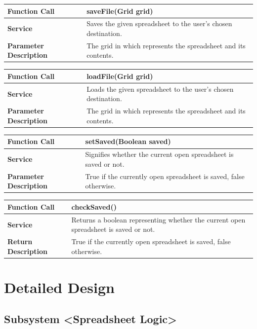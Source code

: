 \documentclass[12pt]{article}
\begin{document}
\begin{tabular}{|p{4.75cm}|p{11.25cm}|}
\hline
\textbf{Function Call} & saveFile(Grid grid)
\\\hline
\textbf{Service} & Saves the given spreadsheet to the user's chosen destination. 
\\\hline
\textbf{Parameter Description} & The grid in which represents the spreadsheet and its contents.
\\\hline
\end{tabular}

\begin{tabular}{|p{4.75cm}|p{11.25cm}|}
\hline
\textbf{Function Call} & loadFile(Grid grid)
\\\hline
\textbf{Service} & Loads the given spreadsheet to the user's chosen destination. 
\\\hline
\textbf{Parameter Description} & The grid in which represents the spreadsheet and its contents.
\\\hline
\end{tabular}

\begin{tabular}{|p{4.75cm}|p{11.25cm}|}
\hline
\textbf{Function Call} & setSaved(Boolean saved)
\\\hline
\textbf{Service} & Signifies whether the current open spreadsheet is saved or not.
\\\hline
\textbf{Parameter Description} & True if the currently open spreadsheet is saved, false otherwise.
\\\hline
\end{tabular}

\begin{tabular}{|p{4.75cm}|p{11.25cm}|}
\hline
\textbf{Function Call} & checkSaved()
\\\hline
\textbf{Service} & Returns a boolean representing whether the current open spreadsheet is saved or not.
\\\hline
\textbf{Return Description} & True if the currently open spreadsheet is saved, false otherwise.
\\\hline
\end{tabular}

\section{Detailed Design}

\subsection{Subsystem \textless Spreadsheet Logic\textgreater}
\end{document}
